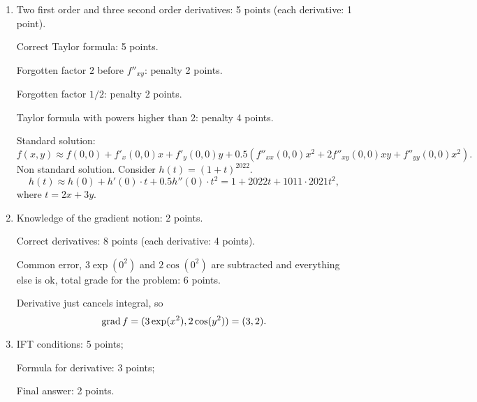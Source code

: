 \begin{enumerate}
    \item Two first order and three second order derivatives: 5 points (each derivative: 1 point).
    
    Correct Taylor formula: 5 points. 

    Forgotten factor $2$ before $f''_{xy}$: penalty 2 points.

    Forgotten factor $1/2$: penalty 2 points.

    Taylor formula with powers higher than 2: penalty 4 points. 

    Standard solution:
    \[
    f(x, y) \approx f(0, 0) + f'_x(0, 0) x + f'_y(0, 0) y + 0.5 (f''_{xx}(0, 0) x^2 + 2f''_{xy}(0, 0) xy + f''_{yy}(0, 0) x^2).
    \]
    Non standard solution. Consider $h(t) = (1 + t)^{2022}$.
    \[
    h(t)  \approx h(0) + h'(0) \cdot t + 0.5 h''(0)\cdot t^2 = 1 + 2022t + 1011 \cdot 2021 t^2,
    \]
    where $t = 2x + 3y$.


    \item Knowledge of the gradient notion: 2 points. 
    
    Correct derivatives: 8 points (each derivative: 4 points).

    Common error, $3\exp(0^2)$ and $2\cos(0^2)$ are subtracted and everything else is ok, 
    total grade for the problem: 6 points.

    Derivative just cancels integral, so
    \[
        \mathrm{grad}\, f = (3 \exp(x^2), 2 \cos(y^2)) = (3, 2).
    \]
    
    \item IFT conditions: 5 points;
    
    Formula for derivative: 3 points;

    Final answer: 2 points.


\end{enumerate}
